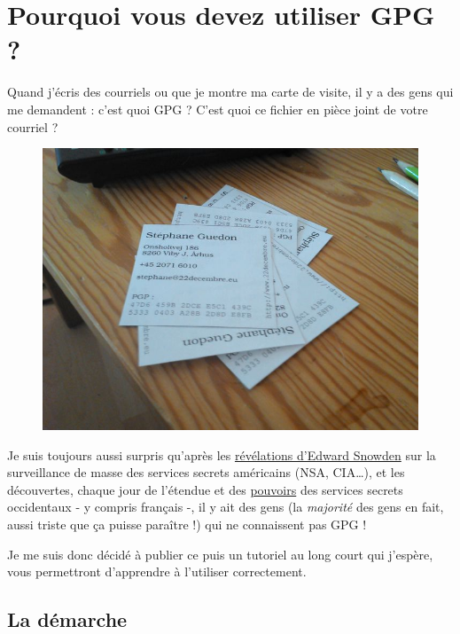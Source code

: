 \chapter[Introduction]{Pourquoi vous devez utiliser GPG ?}

Quand j'écris des courriels ou que je montre ma carte de visite, il y a
des gens qui me demandent : c'est quoi GPG ? C'est quoi ce fichier en
pièce joint de votre courriel ?

\begin{figure}[tbph]
\centering
\includegraphics[width=\linewidth]{images/visiting.jpeg}
\caption[Des cartes de visites comportant une empreinte de clé GPG]{}
\end{figure}

Je suis toujours aussi surpris qu'après les
\href{http://fr.wikipedia.org/wiki/R\%C3\%A9v\%C3\%A9lations_d\%27Edward_Snowden}{révélations
d'Edward Snowden} sur la surveillance de masse des services secrets
américains (NSA, CIA\ldots{}), et les découvertes, chaque jour de
l'étendue et des \href{http://www.lemonde.fr/pixels/article/2015/02/17/un-nouveau-logiciel-espion-de-la-nsa-mis-au-jour_4577707_4408996.html}{pouvoirs}
des services secrets occidentaux - y compris français -, il y ait des
gens (la \emph{majorité} des gens en fait, aussi triste que ça puisse
paraître !) qui ne connaissent pas GPG !

Je me suis donc décidé à publier ce puis un tutoriel au long court qui j'espère, vous permettront d'apprendre à l'utiliser correctement.

\section{La démarche}\label{la-duxe9marche}

